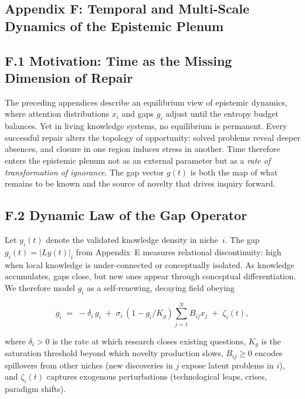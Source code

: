 \documentclass[11pt,a4paper,titlepage]{article}
\theoremstyle{definition}
\begin{document}
\begin{itemize}
\section*{Appendix F: Temporal and Multi-Scale Dynamics of the Epistemic Plenum}
\label{app:temporal-multiscale}

\subsection*{F.1 Motivation: Time as the Missing Dimension of Repair}

The preceding appendices describe an equilibrium view of epistemic dynamics,
where attention distributions $x_i$ and gaps $g_i$ adjust until the entropy budget balances.
Yet in living knowledge systems, no equilibrium is permanent.
Every successful repair alters the topology of opportunity:
solved problems reveal deeper absences, and closure in one region induces
stress in another.
Time therefore enters the epistemic plenum not as an external parameter
but as a \emph{rate of transformation of ignorance}.
The gap vector $g(t)$ is both the map of what remains to be known
and the source of novelty that drives inquiry forward.

\subsection*{F.2 Dynamic Law of the Gap Operator}

Let $y_i(t)$ denote the validated knowledge density in niche~$i$.
The gap $g_i(t)=|L y(t)|_i$ from Appendix~E measures relational discontinuity:
high when local knowledge is under-connected or conceptually isolated.
As knowledge accumulates, gaps close, but new ones appear through conceptual differentiation.
We therefore model $g_i$ as a self-renewing, decaying field obeying

\begin{equation}
\dot g_i \;=\;
-\delta_i\,g_i
\;+\;
\sigma_i\,(1 - g_i/K_g) \sum_{j=1}^N B_{ij} x_j
\;+\;
\zeta_i(t),
\label{eq:g-dynamics}
\end{equation}

where
$\delta_i>0$ is the rate at which research closes existing questions,
$K_g$ is the saturation threshold beyond which novelty production slows,
$B_{ij}\ge0$ encodes spillovers from other niches
(new discoveries in $j$ expose latent problems in $i$),
and $\zeta_i(t)$ captures exogenous perturbations
(technological leaps, crises, paradigm shifts).


\end{itemize}
\end{document}
